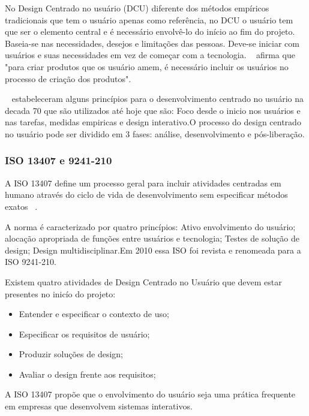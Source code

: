 No Design Centrado no usuário (DCU) diferente dos métodos empíricos tradicionais que tem o usuário apenas como  referência, no DCU o usuário tem que ser o elemento central e é necessário envolvê-lo do início ao fim do projeto. Baseia-se nas necessidades, desejos e limitações das pessoas. Deve-se iniciar com usuários e suas necessidades em vez de começar com a tecnologia. ~ afirma que "para criar produtos que os usuário amem, é necessário incluir os usuários no processo de criação dos produtos". 

~ estabeleceram alguns princípios para o desenvolvimento centrado no usuário na decada 70 que são utilizados até hoje que são: Foco desde o inicio nos usuários e nas tarefas, medidas empiricas e design interativo.O processo do design centrado no usuário pode ser dividido em 3 fases: análise, desenvolvimento e pós-liberação. 


\subsubsection{ISO 13407 e 9241-210}
	
A ISO 13407 define um processo geral para incluir atividades centradas em humano através do ciclo de vida de desenvolvimento sem especificar métodos exatos ~\cite{santos2012}.

A norma é caracterizado por quatro princípios: Ativo envolvimento do usuário; alocação apropriada de funções entre usuários e tecnologia; Testes de solução de design; Design multidisciplinar.Em 2010 essa ISO foi revista e renomeada para a ISO 9241-210.

Existem quatro atividades de Design Centrado no Usuário que devem estar presentes no inicío do projeto:

\begin{itemize}
\item Entender e especificar o contexto de uso;
\item Especificar os requisitos de usuário;
\item Produzir soluções de design;
\item Avaliar o design frente aos requisitos;
\end{itemize}

A ISO 13407 propõe que o envolvimento do usuário seja uma prática frequente em empresas que desenvolvem sistemas interativos.

